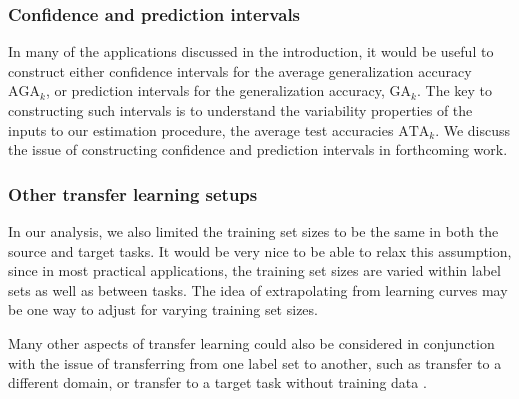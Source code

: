 \documentclass[twoside,11pt]{article}
\begin{document}
\subsubsection*{Confidence and prediction intervals}
In many of the applications discussed in the introduction, it would be useful to construct either confidence intervals for the average generalization accuracy $\text{AGA}_k$, or prediction intervals for the generalization accuracy, $\text{GA}_k$.
The key to constructing such intervals is to understand the variability properties of the inputs to our estimation procedure, the average test accuracies $\text{ATA}_k$.  We discuss the issue of constructing confidence and prediction intervals in forthcoming work.

\subsubsection*{Other transfer learning setups}
In our analysis, we also limited the training set sizes to be the same in both the source and target tasks.  It would be very nice to be able to relax this assumption, since in most practical applications, the training set sizes are varied within label sets as well as between tasks.  The idea of extrapolating from learning curves \citep{cortes1994learning} may be one way to adjust for varying training set sizes.  


Many other aspects of transfer learning could also be considered in
conjunction with the issue of transferring from one label set to
another, such as transfer to a different domain, or transfer to a
target task without training data \citep{pan2010survey}. 

 



\end{document}
